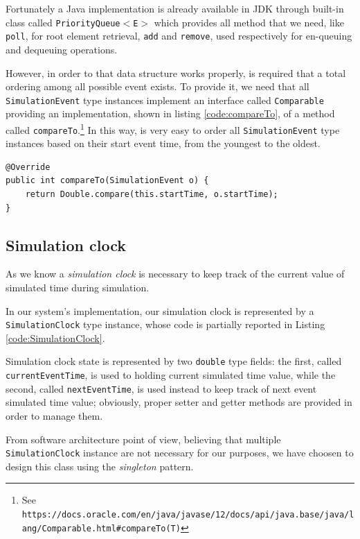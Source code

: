 \documentclass[10pt,a4paper]{article}
\begin{document}
Fortunately a Java implementation is already available in JDK through built-in class called \texttt{PriorityQueue$<$E$>$} which provides all method that we need, like \texttt{poll}, for root element retrieval, \texttt{add} and \texttt{remove}, used respectively for en-queuing and dequeuing operations.

However, in order to that data structure works properly, is required that a total ordering among all possible event exists. To provide it, we need that all \texttt{SimulationEvent} type instances implement an interface called \texttt{Comparable} providing an implementation, shown in listing \ref{code:compareTo}, of a method called \texttt{compareTo}.\footnote{See \texttt{https://docs.oracle.com/en/java/javase/12/docs/api/java.base/java/lang/Comparable.html\#compareTo(T)}} In this way, is very easy to order all \texttt{SimulationEvent} type instances based on their start event time, from the youngest to the oldest. 

\begin{lstlisting}[frame=lines, caption={Snippet of \texttt{SimulationEvent} class implementation}, label={code:compareTo}]
@Override
public int compareTo(SimulationEvent o) {
	return Double.compare(this.startTime, o.startTime);
}
\end{lstlisting}

\subsection{Simulation clock}

As we know a \textit{simulation clock} is necessary to keep track of the current value of simulated time during simulation. 

In our system's implementation, our simulation clock is represented by a \texttt{SimulationClock} type instance, whose code is partially reported in Listing \ref{code:SimulationClock}. 

Simulation clock state is represented by two \texttt{double} type fields: the first, called \texttt{currentEventTime}, is used to holding current simulated time value, while the second, called \texttt{nextEventTime}, is used instead to keep track of next event simulated time value; obviously, proper setter and getter methods are provided in order to manage them.

From software architecture point of view, believing that multiple \texttt{Simulation\-Clock} instance are not necessary for our purposes, we have choosen to design this class using the \textit{singleton} pattern. 
\end{document}
